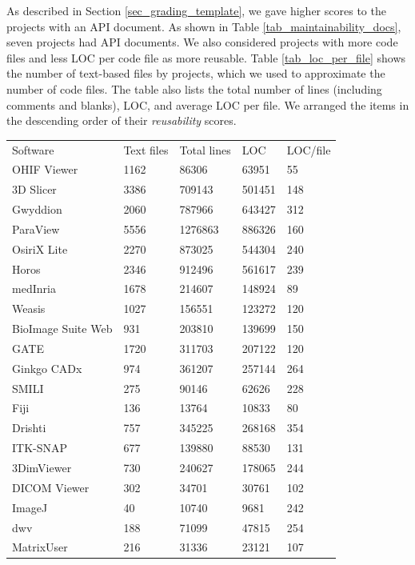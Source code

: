 \documentclass[3p, 12pt,authoryear]{elsarticle}
\begin{document}
As described in Section \ref{sec_grading_template}, we gave higher scores to the
projects with an API document. As shown in Table \ref{tab_maintainability_docs},
seven projects had API documents. We also considered projects with more code
files and less LOC per code file as more reusable. Table \ref{tab_loc_per_file}
shows the number of text-based files by projects, which we used to approximate
the number of code files. The table also lists the total number of lines
(including comments and blanks), LOC, and average LOC per file. We arranged the
items in the descending order of their \textit{reusability} scores. 

\begin{table}[ht]
\centering
\begin{tabular}{lllll}
\hline
\multirow{2}{*}{Software} & \multirow{2}{*}{Text files} & \multirow{2}{*}{Total lines} & \multirow{2}{*}{LOC} & \multirow{2}{*}{LOC/file} \\
 &  &  &  &  \\ \hline
OHIF Viewer & 1162 & 86306 & 63951 & 55 \\
3D Slicer & 3386 & 709143 & 501451 & 148 \\
Gwyddion & 2060 & 787966 & 643427 & 312 \\
ParaView & 5556 & 1276863 & 886326 & 160 \\
OsiriX Lite & 2270 & 873025 & 544304 & 240 \\
Horos & 2346 & 912496 & 561617 & 239 \\
medInria & 1678 & 214607 & 148924 & 89 \\
Weasis & 1027 & 156551 & 123272 & 120 \\
BioImage Suite Web & 931 & 203810 & 139699 & 150 \\
GATE & 1720 & 311703 & 207122 & 120 \\
Ginkgo CADx & 974 & 361207 & 257144 & 264 \\
SMILI & 275 & 90146 & 62626 & 228 \\
Fiji & 136 & 13764 & 10833 & 80 \\
Drishti & 757 & 345225 & 268168 & 354 \\
ITK-SNAP & 677 & 139880 & 88530 & 131 \\
3DimViewer & 730 & 240627 & 178065 & 244 \\
DICOM Viewer & 302 & 34701 & 30761 & 102 \\
ImageJ & 40 & 10740 & 9681 & 242 \\
dwv & 188 & 71099 & 47815 & 254 \\
MatrixUser & 216 & 31336 & 23121 & 107 \\

\end{tabular}
\end{table}
\end{document}
